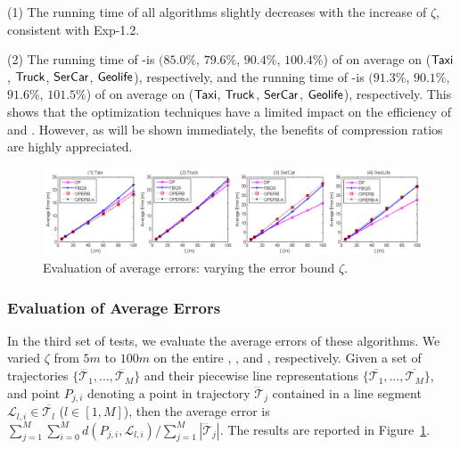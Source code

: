 \sstab(1) The running time of all algorithms slightly decreases with the increase of $\zeta$, consistent with {Exp-1.2}.

\sstab(2) The running time of -\operb is {$(85.0\%$, $79.6\%$, $90.4\%$, $100.4\%$)} of \operb on average on (${\mathsf{Taxi}}$, ${\mathsf{Truck}}$, ${\mathsf{SerCar}}$, ${\mathsf{Geolife}}$), respectively,
and the running time of -\operba is {$(91.3\%$, $90.1\%$, $91.6\%$, $101.5\%$) }of \operba on average on (${\mathsf{Taxi}}$, ${\mathsf{Truck}}$, ${\mathsf{SerCar}}$, ${\mathsf{Geolife}}$), respectively.
This shows that the optimization techniques have a limited impact on the efficiency of \operb and \operba.
However, as will be shown immediately, the benefits of compression ratios are highly appreciated.





\begin{figure}[tb]
\centering
\includegraphics[scale = 0.465]{figures/exp-averageerror.png}
\vspace{-2ex}
\caption{\small Evaluation of average errors: varying the error bound $\zeta$.}
\label{fig:ae}
\vspace{-2ex}
\end{figure}


\vspace{-0.5ex}
\subsubsection{Evaluation of Average Errors}
In the third set of tests, we evaluate the average errors of these algorithms.
We varied $\zeta$ from $5m$ to $100m$ on the entire \taxi, \truck, \sercar and \geolife, respectively.
Given a set of trajectories $\{\dddot{\mathcal{T}_1}, \ldots, \dddot{\mathcal{T}_M}\}$ and their piecewise line representations
$\{\overline{\mathcal{T}_1}, \ldots, \overline{\mathcal{T}_M}\}$, and point $P_{j,i}$ denoting
a point in trajectory $\dddot{\mathcal{T}}_j$ contained in a line segment $\mathcal{L}_{l,i}\in\overline{\mathcal{T}_l}$ ($l\in[1,M]$),
then the average error is $\sum_{j=1}^{M}\sum_{i=0}^{M} d(P_{j,i},
\mathcal{L}_{l,i})/\sum_{j=1}^{M}{|\dddot{\mathcal{T}}_j |}$.
The results are reported in Figure~\ref{fig:ae}.

